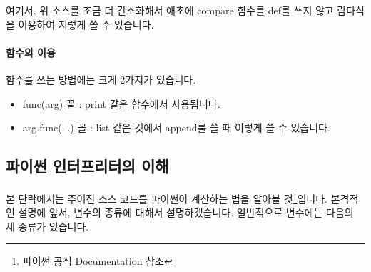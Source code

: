 \documentclass[twoside]{article}
\begin{document}
여기서, 위 소스를 조금 더 간소화해서 애초에 compare 함수를 def를 쓰지 않고 람다식을 이용하여 저렇게 쓸 수 있습니다. 


                
                
\paragraph{함수의 이용} 함수를 쓰는 방법에는 크게 2가지가 있습니다. 

\begin{itemize} 
\item func(arg) 꼴 : print 같은 함수에서 사용됩니다. 
\item arg.func(...) 꼴 : list 같은 것에서 append를 쓸 때 이렇게 쓸 수 있습니다. 
\end{itemize}





%

%
%

\subsection{파이썬 인터프리터의 이해}

본 단락에서는 주어진 소스 코드를 파이썬이 계산하는 법을 알아볼 것\footnote{\href{https://docs.python.org/3/reference/executionmodel.html}{파이썬 공식 Documentation} 참조}입니다. 본격적인 설명에 앞서, 변수의 종류에 대해서 설명하겠습니다. 일반적으로 변수에는 다음의 세 종류가 있습니다. 
\end{document}
